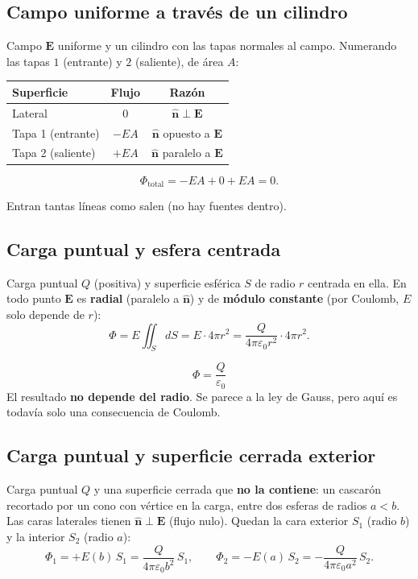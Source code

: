 \documentclass[12pt,a4paper]{article}
\begin{document}
\subsection{Campo uniforme a través de un cilindro}

Campo $\mathbf{E}$ uniforme y un cilindro con las tapas normales al
campo. Numerando las tapas $1$ (entrante) y $2$ (saliente), de área
$A$:

\begin{center}
\begin{tabular}{lcc}
\toprule
\textbf{Superficie} & \textbf{Flujo} & \textbf{Razón} \\
\midrule
Lateral            & $0$    & $\hat{\mathbf{n}} \perp \mathbf{E}$ \\
Tapa 1 (entrante)  & $-EA$  & $\hat{\mathbf{n}}$ opuesto a $\mathbf{E}$ \\
Tapa 2 (saliente)  & $+EA$  & $\hat{\mathbf{n}}$ paralelo a $\mathbf{E}$ \\
\bottomrule
\end{tabular}
\end{center}

\[
\Phi_{\text{total}} = -EA + 0 + EA = 0 .
\]

Entran tantas líneas como salen (no hay fuentes dentro).

\subsection{Carga puntual y esfera centrada}

Carga puntual $Q$ (positiva) y superficie esférica $S$ de radio $r$
centrada en ella. En todo punto $\mathbf{E}$ es \textbf{radial}
(paralelo a $\hat{\mathbf{n}}$) y de \textbf{módulo constante} (por
Coulomb, $E$ solo depende de $r$):
\[
\Phi = E \iint_S dS = E \cdot 4\pi r^{2}
     = \frac{Q}{4\pi\varepsilon_0 r^{2}} \cdot 4\pi r^{2}.
\]

\begin{keybox}
  \[
  \boxed{\Phi = \frac{Q}{\varepsilon_0}}
  \]
  El resultado \textbf{no depende del radio}. Se parece a la ley de
  Gauss, pero aquí es todavía solo una consecuencia de Coulomb.
\end{keybox}

\subsection{Carga puntual y superficie cerrada exterior}

Carga puntual $Q$ y una superficie cerrada que \textbf{no la contiene}:
un cascarón recortado por un cono con vértice en la carga, entre dos
esferas de radios $a < b$. Las caras laterales tienen
$\hat{\mathbf{n}} \perp \mathbf{E}$ (flujo nulo). Quedan la cara
exterior $S_1$ (radio $b$) y la interior $S_2$ (radio $a$):
\[
\Phi_1 = +E(b)\, S_1 = \frac{Q}{4\pi\varepsilon_0 b^{2}}\, S_1,
\qquad
\Phi_2 = -E(a)\, S_2 = -\frac{Q}{4\pi\varepsilon_0 a^{2}}\, S_2 .
\]
\end{document}
